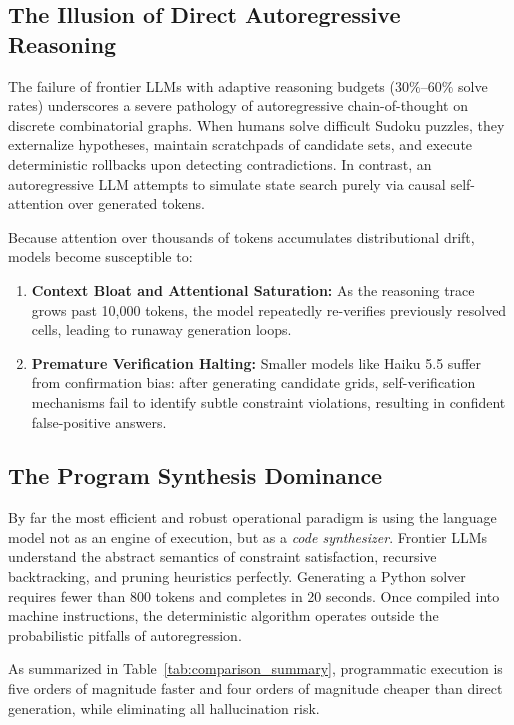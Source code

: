 \documentclass{article} %
\begin{document}
\subsection{The Illusion of Direct Autoregressive Reasoning}
The failure of frontier LLMs with adaptive reasoning budgets ($30\%\text{--}60\%$ solve rates) underscores a severe pathology of autoregressive chain-of-thought on discrete combinatorial graphs. When humans solve difficult Sudoku puzzles, they externalize hypotheses, maintain scratchpads of candidate sets, and execute deterministic rollbacks upon detecting contradictions. In contrast, an autoregressive LLM attempts to simulate state search purely via causal self-attention over generated tokens.

Because attention over thousands of tokens accumulates distributional drift, models become susceptible to:
\begin{enumerate}
    \item \textbf{Context Bloat and Attentional Saturation:} As the reasoning trace grows past 10,000 tokens, the model repeatedly re-verifies previously resolved cells, leading to runaway generation loops.
    \item \textbf{Premature Verification Halting:} Smaller models like Haiku 5.5 suffer from confirmation bias: after generating candidate grids, self-verification mechanisms fail to identify subtle constraint violations, resulting in confident false-positive answers.
\end{enumerate}

\subsection{The Program Synthesis Dominance}
By far the most efficient and robust operational paradigm is using the language model not as an engine of execution, but as a \textit{code synthesizer}. Frontier LLMs understand the abstract semantics of constraint satisfaction, recursive backtracking, and pruning heuristics perfectly. Generating a Python solver requires fewer than 800 tokens and completes in 20 seconds. Once compiled into machine instructions, the deterministic algorithm operates outside the probabilistic pitfalls of autoregression.

As summarized in Table~\ref{tab:comparison_summary}, programmatic execution is five orders of magnitude faster and four orders of magnitude cheaper than direct generation, while eliminating all hallucination risk.
\end{document}
